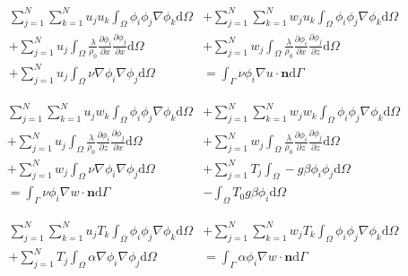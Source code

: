 \begin{align}
\label{eq:femconvection:galerkinu}
\sum^N_{j=1}\sum^N_{k=1}u_ju_k\int_\Omega \phi_i\phi_j\nabla\phi_k \mathrm{d}\Omega &+
\sum^N_{j=1}\sum^N_{k=1}w_ju_k\int_\Omega \phi_i\phi_j\nabla\phi_k \mathrm{d}\Omega  \\ +
\nonumber
\sum^N_{j=1} u_j\int_\Omega\frac{\lambda}{\rho_0}
\frac{\partial \phi_i}{\partial x}\frac{\partial \phi_j}{\partial x} \mathrm{d}\Omega &+
\sum^N_{j=1} w_j\int_\Omega\frac{\lambda}{\rho_0}\frac{\partial \phi_i}{\partial x}
\frac{\partial \phi_j}{\partial z} \mathrm{d}\Omega  \\ +
\nonumber
\sum^N_{j=1} u_j \int_\Omega \nu\nabla\phi_i\nabla\phi_j \mathrm{d}\Omega &=
\int_\Gamma \nu\phi_i\nabla u \cdot \mathbf{n} \mathrm{d}\Gamma
\end{align}

\begin{align}
\label{eq:femconvection:galerkinw}
\sum^N_{j=1}\sum^N_{k=1}u_jw_k\int_\Omega \phi_i\phi_j\nabla\phi_k \mathrm{d}\Omega &+
\sum^N_{j=1}\sum^N_{k=1}w_jw_k\int_\Omega \phi_i\phi_j\nabla\phi_k \mathrm{d}\Omega \\ +
\nonumber
\sum^N_{j=1} u_j\int_\Omega \frac{\lambda}{\rho_0}\frac{\partial \phi_i}{\partial z}
\frac{\partial \phi_j}{\partial x} \mathrm{d}\Omega &+
\sum^N_{j=1} w_j\int_\Omega \frac{\lambda}{\rho_0}
\frac{\partial \phi_i}{\partial z}\frac{\partial \phi_j}{\partial z} \mathrm{d}\Omega \\ +
\nonumber
\sum^N_{j=1} w_j \int_\Omega \nu\nabla\phi_i\nabla\phi_j \mathrm{d}\Omega &+
\sum^N_{j=1}T_j \int_\Omega - g\beta\phi_i\phi_j \mathrm{d}\Omega \\
\nonumber
= \int_\Gamma \nu\phi_i\nabla w \cdot \mathbf{n} \mathrm{d}\Gamma &-
\int_\Omega T_0g\beta\phi_i\mathrm{d}\Omega
\end{align}

\begin{align}
\label{eq:femconvection:galerkinT}
\sum^N_{j=1}\sum^N_{k=1}u_jT_k\int_\Omega \phi_i\phi_j\nabla\phi_k \mathrm{d}\Omega &+
\sum^N_{j=1}\sum^N_{k=1}w_jT_k\int_\Omega \phi_i\phi_j\nabla\phi_k \mathrm{d}\Omega \\ +
\nonumber
\sum^N_{j=1} T_j \int_\Omega \alpha\nabla\phi_i\nabla\phi_j \mathrm{d}\Omega &=
\int_\Gamma \alpha\phi_i\nabla w \cdot \mathbf{n} \mathrm{d}\Gamma
\end{align}

